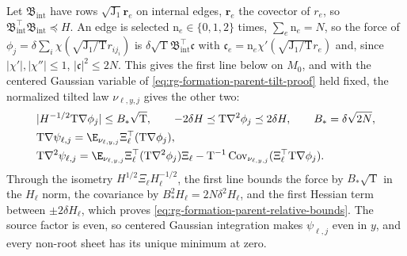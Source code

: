 Let \(\mathfrak B_{\mathrm{int}}\) have rows \(\sqrt{\mathrm J_1}\mathbf r_e\)
on internal edges, \(\mathbf r_e\) the covector of \(r_e\), so
\(\mathfrak B_{\mathrm{int}}^\top\mathfrak B_{\mathrm{int}}\preceq H\). An edge is
selected \(\mathrm n_e\in\{0,1,2\}\) times, \(\sum_e\mathrm n_e=N\), so the
force of \(\phi_j=\delta\sum_i\chi(\sqrt{\mathrm J_1/\mathrm T} r_{ij_i})\) is
\(\delta\sqrt{\mathrm T}\mathfrak B_{\mathrm{int}}^\top\mathfrak c\) with
\(\mathfrak c_e=\mathrm n_e\chi'(\sqrt{\mathrm J_1/\mathrm T} r_e)\) and, since
\(|\chi'|,|\chi''|\le1\), \(|\mathfrak c|^2\le2N\). This gives the first line
below on \(M_0\), and with the centered Gaussian variable of
\cref{eq:rg-formation-parent-tilt-proof} held fixed, the normalized tilted law
\(\nu_{\ell,y,j}\) gives the other two:
\begin{align}
 &|H^{-1/2}\mathrm T\nabla\phi_j|\le B_*\sqrt{\mathrm T},
 \qquad
 -2\delta H\preceq \mathrm T\nabla^2\phi_j\preceq2\delta H,
 \qquad B_*=\delta\sqrt{2N},
 \label{eq:rg-formation-original-relative-bounds}\\
 &\mathrm T\nabla\psi_{\ell,j}
 =\E_{\nu_{\ell,y,j}}\Xi_\ell^\top(\mathrm T\nabla\phi_j),
 \label{eq:rg-formation-marginal-force-proof}\\
 &\mathrm T\nabla^2\psi_{\ell,j}
 =\E_{\nu_{\ell,y,j}}\Xi_\ell^\top(\mathrm T\nabla^2\phi_j)\Xi_\ell
       -\mathrm T^{-1}\operatorname{Cov}_{\nu_{\ell,y,j}}
                    (\Xi_\ell^\top\mathrm T\nabla\phi_j).
 \label{eq:rg-formation-marginal-hessian-proof}
\end{align}
Through the isometry \(H^{1/2}\Xi_\ell H_\ell^{-1/2}\), the first line bounds
the force by \(B_*\sqrt{\mathrm T}\) in the \(H_\ell\) norm, the covariance by
\(B_*^2H_\ell=2N\delta^2H_\ell\), and the first Hessian term between
\(\pm2\delta H_\ell\), which proves
\cref{eq:rg-formation-parent-relative-bounds}. The source factor is even, so
centered Gaussian integration makes \(\psi_{\ell,j}\) even in \(y\), and every
non-root sheet has its unique minimum at zero.

